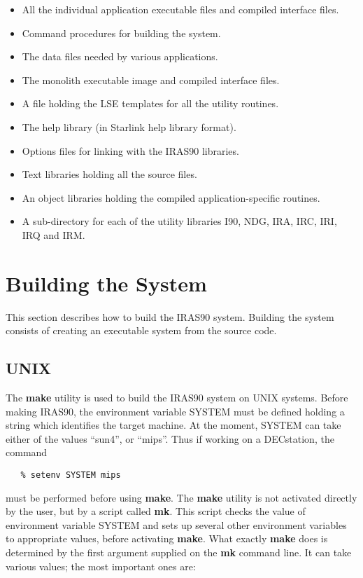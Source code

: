 \begin{itemize}
\item All the individual application executable files and compiled interface 
files.
\item Command procedures for building the system.
\item The data files needed by various applications.
\item The monolith executable image and compiled interface files.
\item A file holding the {\small LSE} templates for all the utility routines.
\item The help library (in Starlink help library format).
\item Options files for linking with the {\small IRAS90} libraries.
\item Text libraries holding all the source files.
\item An object libraries holding the compiled application-specific routines.
\item A sub-directory for each of the utility libraries {\small I90, NDG, IRA, 
IRC, IRI, IRQ} and {\small IRM}.
\end{itemize}

\section{Building the System}
\label{SEC:BUILD}
This section describes how to build the {\small IRAS90} system. Building the
system consists of creating an executable system from the source code. 

\subsection{UNIX}
The {\bf make} utility is used to build the {\small IRAS90} system on {\small 
UNIX} systems. Before making {\small IRAS90}, the environment variable {\small 
SYSTEM} must be defined holding a string which identifies the target machine. 
At the moment, {\small SYSTEM} can take either of the values ``sun4'', or 
``mips''. Thus if working on a DECstation, the command 

\small
\begin{verbatim}
   % setenv SYSTEM mips
\end{verbatim}
\normalsize

must be performed before using {\bf make}. The {\bf make} utility is not
activated directly by the user, but by a script called {\bf mk}. This script
checks the value of environment variable {\small SYSTEM} and sets up several
other environment variables to appropriate values, before activating {\bf make}.
What exactly {\bf make} does is determined by the first argument supplied on the 
{\bf mk} command line. It can take various values; the most important ones are:


